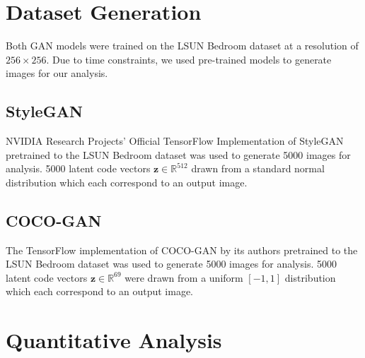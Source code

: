 \documentclass[12pt]{article}
\begin{document}
\begin{multicols*}{2}
        \section{Dataset Generation}
        \label{sec:dataset}
        Both GAN models were trained on the LSUN Bedroom dataset\cite{lsunBedroom} at a resolution of $256 \times 256$.
        Due to time constraints, we used pre-trained models to generate images for our analysis.

        \label{sec:datasetGeneration}
        \subsection{StyleGAN}
        \label{subsec:styleganGeneration}
        NVIDIA Research Projects' Official TensorFlow Implementation of StyleGAN pretrained to the LSUN Bedroom dataset\cite{styleGANCode} was used to generate 5000 images for analysis.
        5000 latent code vectors $\mathbf{z} \in \mathbb{R}^{512}$ drawn from a standard normal distribution which each correspond to an output image.

        \subsection{COCO-GAN}
        \label{subsec:cocoganGeneration}
        The TensorFlow implementation of COCO-GAN by its authors pretrained to the LSUN Bedroom dataset\cite{cocogan} was used to generate 5000 images for analysis.
        5000 latent code vectors $\mathbf{z} \in \mathbb{R}^{69}$ were drawn from a uniform $[-1, 1]$ distribution which each correspond to an output image.

        \section{Quantitative Analysis}
        \label{sec:quantitative}

\end{multicols*}
\end{document}
